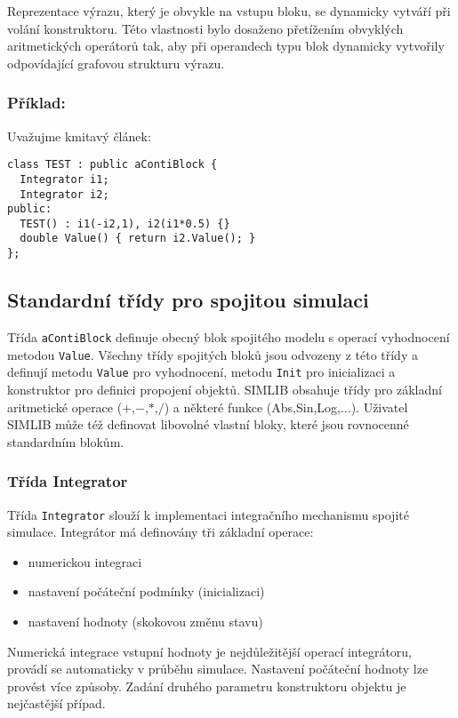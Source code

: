\documentclass[a4paper]{article}
\begin{document}
Reprezentace výrazu, který je obvykle na vstupu bloku, se
dynamicky vytváří při volání konstruktoru. Této vlastnosti bylo
dosaženo přetížením obvyklých aritmetických operátorů tak, aby
při operandech typu blok dynamicky vytvořily odpovídající
grafovou strukturu výrazu.

\subsubsection*{Příklad:}

Uvažujme kmitavý článek:

\begin{verbatim}
class TEST : public aContiBlock {
  Integrator i1;
  Integrator i2;
public:
  TEST() : i1(-i2,1), i2(i1*0.5) {}
  double Value() { return i2.Value(); }
};
\end{verbatim}


\subsection{Standardní třídy pro spojitou simulaci}

Třída \verb|aContiBlock| definuje obecný blok spojitého modelu s operací
vyhodnocení metodou \verb|Value|. Všechny třídy spojitých bloků jsou
odvozeny z této třídy a definují metodu \verb|Value| pro vyhodnocení,
metodu \verb|Init| pro inicializaci a konstruktor pro definici
propojení objektů. SIMLIB obsahuje třídy pro základní
aritmetické operace ($+$,$-$,$*$,$/$) a některé funkce
(Abs,Sin,Log,...). Uživatel SIMLIB může též definovat libovolné vlastní
bloky, které jsou rovnocenné standardním blokům.


\subsubsection{Třída Integrator}

Třída \verb|Integrator| slouží k implementaci integračního mechanismu
spojité simulace. Integrátor má definovány tři základní operace:

\begin{itemize}
\item  numerickou integraci
\item  nastavení počáteční podmínky (inicializaci)
\item  nastavení hodnoty (skokovou změnu stavu)
\end{itemize}

Numerická integrace vstupní hodnoty je nejdůležitější operací
integrátoru, provádí se automaticky v průběhu simulace.
Nastavení počáteční hodnoty lze provést více způsoby. Zadání
druhého parametru konstruktoru objektu je nejčastější případ.
\end{document}
